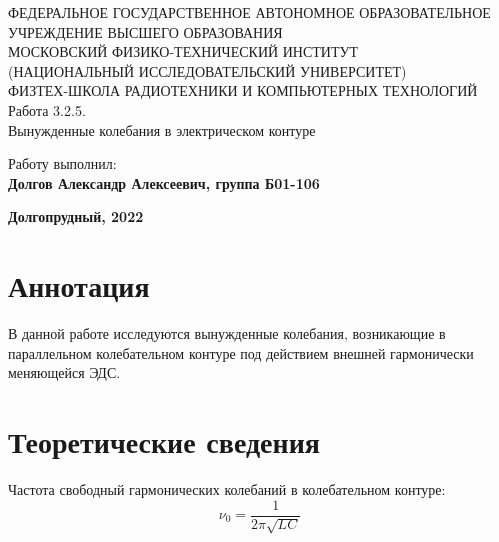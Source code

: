 \documentclass[15pt,a5paper,reqno]{article}
\begin{document}
\begin{center}
  {\small ФЕДЕРАЛЬНОЕ ГОСУДАРСТВЕННОЕ АВТОНОМНОЕ ОБРАЗОВАТЕЛЬНОЕ\\ УЧРЕЖДЕНИЕ ВЫСШЕГО ОБРАЗОВАНИЯ\\ МОСКОВСКИЙ ФИЗИКО-ТЕХНИЧЕСКИЙ ИНСТИТУТ\\ (НАЦИОНАЛЬНЫЙ ИССЛЕДОВАТЕЛЬСКИЙ УНИВЕРСИТЕТ)\\ ФИЗТЕХ-ШКОЛА РАДИОТЕХНИКИ И КОМПЬЮТЕРНЫХ ТЕХНОЛОГИЙ}\\
  \hfill \break
  \hfill \break
  \hfill \break
  \Huge{Работа 3.2.5. \\ Вынужденные колебания в электрическом контуре}\\
\end{center}

\hfill \break
\hfill \break
\hfill \break
\hfill \break
\hfill \break
\hfill \break
\hfill \break
\hfill \break

\begin{flushright}
  \normalsize{Работу выполнил:}\\
  \normalsize{\textbf{Долгов Александр Алексеевич, группа Б01-106}}\\
\end{flushright}

\begin{center}
  \normalsize{\textbf{Долгопрудный, 2022}}
\end{center}

\thispagestyle{empty} %


\newpage
\thispagestyle{plain}
\tableofcontents
\thispagestyle{plain}
\newpage

\section{Аннотация}

    В данной работе исследуются вынужденные колебания, возникающие в параллельном колебательном контуре под действием внешней гармонически меняющейся ЭДС.
	
\section{Теоретические сведения}

    Частота свободный гармонических колебаний в колебательном контуре:
    \begin{equation}\label{freq_0}
        \boxed{\nu_0 = \frac{1}{2\pi\sqrt{LC}}}
    \end{equation}
\end{document}
